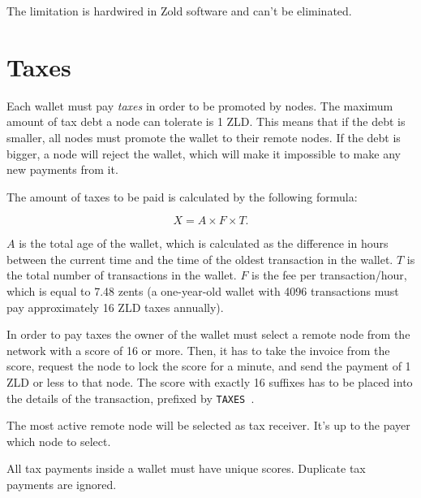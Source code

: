 \documentclass[11pt,oneside]{article}
\newcommand\dd[1]{\colorbox{gray!30}{\texttt{#1}}}
\begin{document}
The limitation is hardwired in Zold software and can't be eliminated.

\section{Taxes}\label{sec:taxes}

Each wallet must pay \emph{taxes} in order to be promoted by nodes.
The maximum amount of tax debt a node can tolerate is 1 ZLD. This means
that if the debt is smaller, all nodes must promote the wallet to their
remote nodes. If the debt is bigger, a node will reject the wallet,
which will make it impossible to make any new payments from it.

The amount of taxes to be paid is calculated by the following formula:

$$X = A \times F \times T.$$

$A$ is the total age of the wallet,
which is calculated as the difference in hours between the current time
and the time of the oldest transaction in the wallet.
$T$ is the total number of transactions in the wallet.
$F$ is the fee per transaction/hour, which is equal to 7.48 zents
(a one-year-old wallet with 4096 transactions must pay approximately 16 ZLD taxes annually).

In order to pay taxes the owner of the wallet must select a remote
node from the network with a score of 16 or more. Then, it has to
take the invoice from the score, request the node to lock the score
for a minute, and send the payment of 1 ZLD or less
to that node. The score with exactly 16 suffixes
has to be placed into the details of the transaction,
prefixed by \dd{TAXES }.

The most active remote node will be selected as tax receiver.
It's up to the payer which node to select.

All tax payments inside a wallet must have unique scores.
Duplicate tax payments are ignored.

\end{document}
